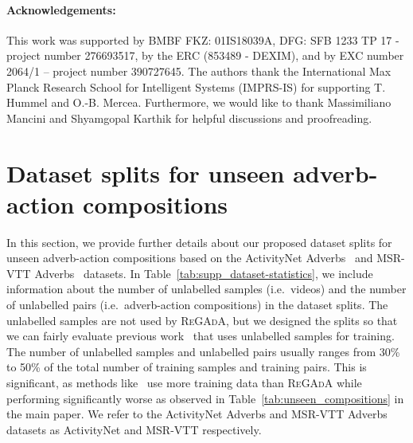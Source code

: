 \documentclass[table]{bmvc2k}
\newcommand{\modelName}{\textsc{ReGAdA}\xspace}
\begin{document}
\paragraph{Acknowledgements:} This work was supported by BMBF FKZ: 01IS18039A, DFG: SFB 1233 TP 17 - project number 276693517, by the ERC (853489 - DEXIM), and by EXC number 2064/1 – project number 390727645. The authors thank the International Max Planck Research School for Intelligent Systems (IMPRS-IS) for supporting T. Hummel and O.-B. Mercea. Furthermore, we would like to thank Massimiliano Mancini and Shyamgopal Karthik for helpful discussions and proofreading.






\clearpage

\appendix
\vspace{6mm}
\renewcommand{\appendixpagename}{\color{bmvc_blue} \LARGE Supplementary material:\\ Video-adverb retrieval with compositional adverb-action embeddings}
\appendixpage
\addappheadtotoc
\vspace{6mm}

\section{Dataset splits for unseen adverb-action compositions}

In this section, we provide further details about our proposed dataset splits for unseen adverb-action compositions based on the  ActivityNet Adverbs~\cite{doughty_action_2020,caba2015activitynet} and MSR-VTT Adverbs~\cite{doughty_action_2020,xu2016msr} datasets. In Table~\ref{tab:supp_dataset-statistics}, we include information about the number of unlabelled samples (i.e.\ videos) and the number of unlabelled pairs (i.e.\ adverb-action compositions) in the dataset splits. 
The unlabelled samples are not used by \modelName, but we designed the splits so that we can fairly evaluate previous work~\cite{doughty_how_2022} that uses unlabelled samples for training. The number of unlabelled samples and unlabelled pairs usually ranges from 30\% to 50\% of the total number of training samples and training pairs. This is significant, as methods like~\cite{doughty_how_2022} use more training data than \modelName while performing significantly worse as observed in Table~\ref{tab:unseen_compositions} in the main paper. We refer to the ActivityNet Adverbs and MSR-VTT Adverbs datasets as ActivityNet and MSR-VTT respectively.
\end{document}

